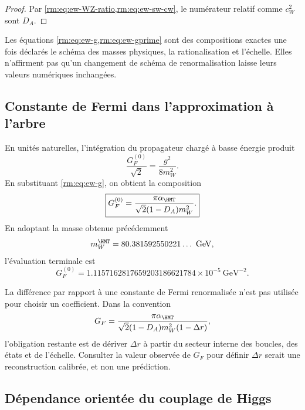 \begin{proof}
Par \cref{rm:eq:ew-WZ-ratio,rm:eq:ew-sw-cw}, le numérateur relatif comme
\(c_W^2\) sont \(D_A\).
\end{proof}

Les équations \cref{rm:eq:ew-g,rm:eq:ew-gprime} sont des compositions exactes une
fois déclarés le schéma des masses physiques, la rationalisation et l'échelle. Elles
n'affirment pas qu'un changement de schéma de renormalisation laisse leurs
valeurs numériques inchangées.

\subsection{Constante de Fermi dans l'approximation à l'arbre}

En unités naturelles, l'intégration du propagateur chargé à basse
énergie produit
\begin{equation}
\label{rm:eq:ew-GF-def}
\frac{G_F^{(0)}}{\sqrt2}=\frac{g^2}{8m_W^2}.
\end{equation}
En substituant \cref{rm:eq:ew-g}, on obtient la composition
\begin{equation}
\label{rm:eq:ew-GF}
\boxed{
G_F^{(0)}
=\frac{\pi\alpha_{\HMT}}
{\sqrt2(1-D_A)m_W^2}.}
\end{equation}
En adoptant la masse obtenue précédemment
\begin{equation}
\label{rm:eq:ew-W-output}
m_W^{\HMT}=80.381592550221\ldots\ \mathrm{GeV},
\end{equation}
l'évaluation terminale est
\begin{equation}
\label{rm:eq:ew-GF-value}
\boxed{
G_F^{(0)}
=1.1157162817659203186621784\times10^{-5}\ \mathrm{GeV}^{-2}.}
\end{equation}

La différence par rapport à une constante de Fermi renormalisée n'est pas utilisée
pour choisir un coefficient. Dans la convention
\begin{equation}
\label{rm:eq:ew-Delta-r}
G_F
=\frac{\pi\alpha_{\HMT}}
{\sqrt2(1-D_A)m_W^2(1-\Delta r)},
\end{equation}
l'obligation restante est de dériver \(\Delta r\) à partir du secteur interne des
boucles, des états et de l'échelle. Consulter la valeur observée de \(G_F\) pour définir
\(\Delta r\) serait une reconstruction calibrée, et non une prédiction.

\subsection{Dépendance orientée du couplage de Higgs}

